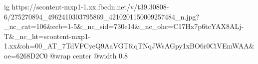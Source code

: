  
 
 
 
 

\ifcmt
  ig https://scontent-mxp1-1.xx.fbcdn.net/v/t39.30808-6/275270894_4962410303795869_4210201150009257484_n.jpg?_nc_cat=106&ccb=1-5&_nc_sid=730e14&_nc_ohc=C17Hx7p6tcYAX8ALj-T&_nc_ht=scontent-mxp1-1.xx&oh=00_AT_7TdVFCyeQ9AaVGT6iqTNqJWsAGpy1xBO6r0CiVEmWAA&oe=6268D2C0
  @wrap center
  @width 0.8
\fi
